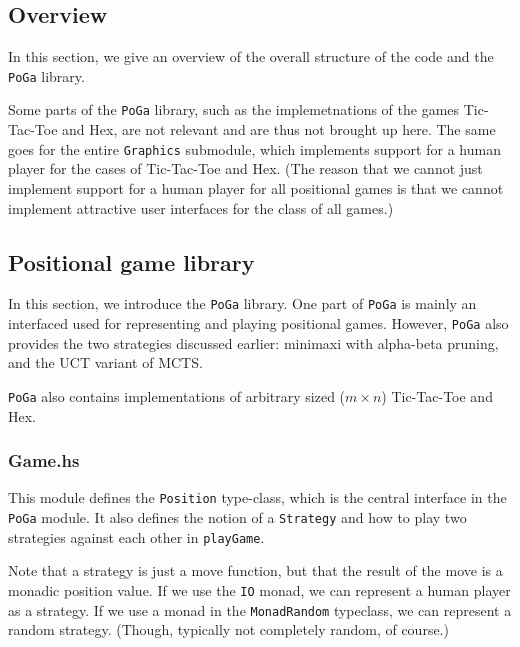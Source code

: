 \subsection {Overview}

In this section, we give an overview of the overall structure of the code and the \texttt{PoGa} library.


Some parts of the \texttt{PoGa} library, such as the implemetnations of the games Tic-Tac-Toe and Hex, are not relevant and are thus not brought up here.
The same goes for the entire \texttt{Graphics} submodule, which implements support for a human player for the cases of Tic-Tac-Toe and Hex.
(The reason that we cannot just implement support for a human player for all positional games is that we cannot implement attractive user interfaces for the class of all games.)


\subsection {Positional game library}

In this section, we introduce the \texttt{PoGa} library.
One part of \texttt{PoGa} is mainly an interfaced used for representing and playing positional games.
However, \texttt{PoGa} also provides the two strategies discussed earlier: minimaxi with alpha-beta pruning, and the UCT variant of MCTS.

\texttt{PoGa} also contains implementations of arbitrary sized ($m \times n$) Tic-Tac-Toe and Hex.

\subsubsection {Game.hs}

This module defines the \texttt{Position} type-class, which is the central interface in the \texttt{PoGa} module.
It also defines the notion of a \texttt{Strategy} and how to play two strategies against each other in \texttt{playGame}.

Note that a strategy is just a move function, but that the result of the move is a monadic position value.
If we use the \texttt{IO} monad, we can represent a human player as a strategy. If we use a monad in the \texttt{MonadRandom} typeclass, we can represent a random strategy. (Though, typically not completely random, of course.)

